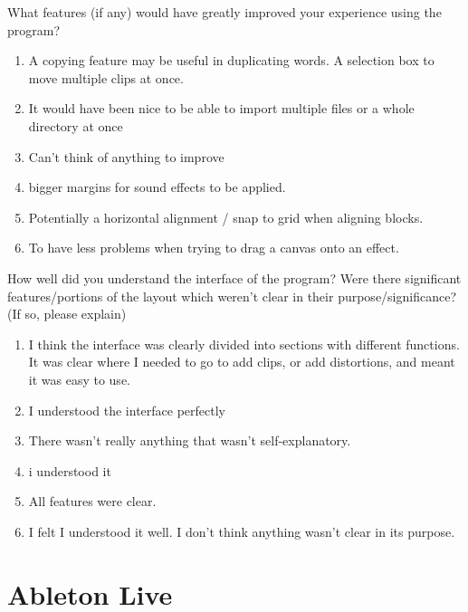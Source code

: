 \documentclass[12pt,a4paper,oneside,openright]{report}
\begin{document}
What features (if any) would have greatly improved your experience using the program?
\begin{enumerate}
    \item A copying feature may be useful in duplicating words. A selection box to move multiple clips at once.
    \item It would have been nice to be able to import multiple files or a whole directory at once
    \item Can't think of anything to improve
    \item bigger margins for sound effects to be applied.
    \item Potentially a horizontal alignment / snap to grid when aligning blocks.
    \item To have less problems when trying to drag a canvas onto an effect.
\end{enumerate}

How well did you understand the interface of the program? Were there significant features/portions of the layout which weren't clear in their purpose/significance? (If so, please explain)
\begin{enumerate}
    \item I think the interface was clearly divided into sections with different functions. It was clear where I needed to go to add clips, or add distortions, and meant it was easy to use.
    \item I understood the interface perfectly
    \item There wasn't really anything that wasn't self-explanatory.
    \item i understood it
    \item All features were clear.
    \item I felt I understood it well. I don’t think anything wasn’t clear in its purpose.
\end{enumerate}

\section{Ableton Live}
\end{document}
